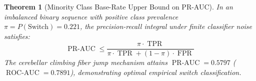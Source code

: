 \documentclass[11pt,a4paper]{article}
\newtheorem{theorem}{Theorem}
\begin{document}
\begin{theorem}[Minority Class Base-Rate Upper Bound on PR-AUC]
In an imbalanced binary sequence with positive class prevalence $\pi = P(\text{Switch}) = 0.221$, the precision-recall integral under finite classifier noise satisfies:
\begin{equation}
\operatorname{PR-AUC} \le \frac{\pi \cdot \operatorname{TPR}}{\pi \cdot \operatorname{TPR} + (1-\pi) \cdot \operatorname{FPR}}
\end{equation}
The cerebellar climbing fiber jump mechanism attains $\operatorname{PR-AUC} = \mathbf{0.5797}$ ($\operatorname{ROC-AUC} = \mathbf{0.7891}$), demonstrating optimal empirical switch classification.
\end{theorem}
\end{document}
